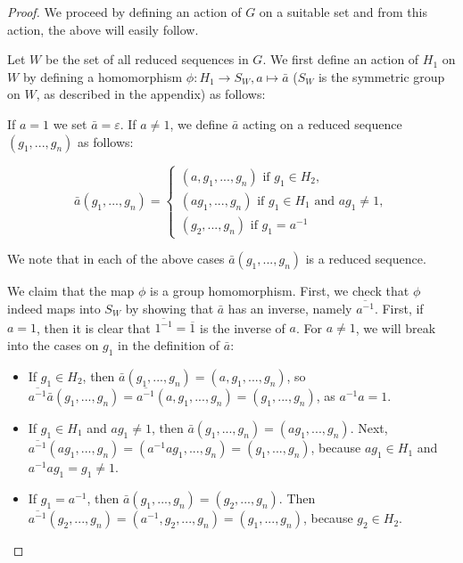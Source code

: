 \documentclass[12pt]{article}
\newcommand{\vs}{\vskip10pt}
\begin{document}
	\begin{proof}
		
		We proceed by defining an action of $G$ on a suitable set and from this action, the above will easily follow. 
		
		\vs 
		
		Let $W$ be the set of all reduced sequences in $G$. We first define an action of $H_1$ on $W$ by defining a homomorphism $\phi: H_1 \rightarrow S_W, a \mapsto \bar{a}$ ($S_W$ is the symmetric group on $W$, as described in the appendix) as follows: 
		
		\vs 
		
		If $a = 1$ we set $\bar{a} = \varepsilon$. If $a \neq 1$, we define $\bar{a}$ acting on a  reduced sequence $(g_1,...,g_n)$ as follows: 
		
		\vs 
		
		\[ \bar{a}(g_1,...,g_n) = \begin{cases} 
		(a, g_1,...,g_n) \text{ if } g_1 \in H_2, \\
		(ag_1,...,g_n) \text{ if } g_1 \in H_1 \text{ and } ag_1 \neq 1, \\
		(g_2,...,g_n) \text{ if } g_1 = a^{-1}
		\end{cases}
		\]
		
		We note that in each of the above cases $\bar{a}(g_1,...,g_n) $ is a reduced sequence. 
		
		\vs
		
		We claim that the map $\phi$ is a group homomorphism. First, we check that $\phi$ indeed maps into $S_W$ by showing that $\bar{a}$ has an inverse, namely $\overline{a^{-1}}$. First, if $a = 1$, then it is clear that $\overline{1^{-1}} = \overline{1}$ is the inverse of $a$. For $a \neq 1$, we will break into the cases on $g_1$ in the definition of $\bar{a}$:
		
		\begin{itemize}
			\item If $g_1 \in H_2$, then $\bar{a}(g_1,...,g_n) = (a, g_1,...,g_n)$, so $\overline{a^{-1}} \bar{a} (g_1,...,g_n) = \overline{a^{-1}}(a, g_1,...,g_n) = (g_1,...,g_n)$, as $a^{-1}a=1$. 
			\item If $g_1 \in H_1$ and $ag_1 \neq 1$, then $\bar{a}(g_1,...,g_n) = (ag_1,...,g_n)$. Next, $\overline{a^{-1}}(ag_1,...,g_n) = (a^{-1}ag_1,...,g_n) = (g_1,...,g_n)$, because $a g_1 \in H_1$ and $a^{-1} a g_1 = g_1 \neq 1$.
			\item If $g_1 = a^{-1}$, then $\bar{a} (g_1,...,g_n) = (g_2,...,g_n)$. Then $\overline{a^{-1}}(g_2,...,g_n) = (a^{-1}, g_2,...,g_n) = (g_1,...,g_n)$, because $g_2 \in H_2$. 
		\end{itemize}
	

\end{proof}
\end{document}

